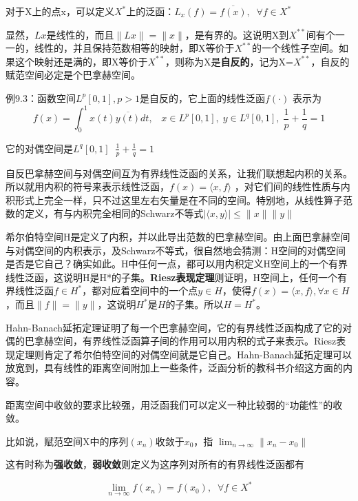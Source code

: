 对于X上的点x，可以定义$ X^* $上的泛函：$ L_x(f) = \overline{f(x)},\;\;  \forall f \in X^* $ 

显然，$ Lx $是线性的，而且$ \|Lx\| = \|x\| $，是有界的。这说明X到$ X^{**} $间有个一一的，线性的，并且保持范数相等的映射，即X等价于$ X^{**} $的一个线性子空间。如果这个映射还是满的，即X等价于$ X^{**} $，则称为X是\textbf{自反的}，记为X=$ X^{**} $，自反的赋范空间必定是个巴拿赫空间。


\kaishu\setlength{\leftskip}{1em}

例9.3：函数空间$ L^p[0,1], p>1 $是自反的，它上面的线性泛函$ f(\cdot) $ 表示为
\[f(x)=\int_0^1 x(t)\overline{y(t)}dt, \;\;\; x\in L^p[0,1],\; y \in L^q[0,1], \;\frac{1}{p}+\frac{1}{q}=1\]

它的对偶空间是$ L^q[0,1] \;\; \frac{1}{p}+\frac{1}{q}=1 $

\songti\setlength{\leftskip}{0em}


自反巴拿赫空间与对偶空间互为有界线性泛函的关系，让我们联想起内积的关系。所以就用内积的符号来表示线性泛函，$f(x)=\langle x,f\rangle$
，对它们间的线性性质与内积形式上完全一样，只不过这里左右矢量是在不同的空间。特别地，从线性算子范数的定义，有与内积完全相同的Schwarz不等式$  |\langle x,y\rangle |\leq \|x\|\|y\| $

希尔伯特空间H是定义了内积，并以此导出范数的巴拿赫空间。由上面巴拿赫空间与对偶空间的内积表示，及Schwarz不等式，很自然地会猜测：H空间的对偶空间是否是它自己？确实如此。H中任何一点，都可以用内积定义H空间上的一个有界线性泛函，这说明H是H*的子集。\textbf{Riesz表现定理}则证明，H空间上，任何一个有界线性泛函$ f\in H^* $，都对应着空间中的一个点$ y\in H $，使得$ f(x)= \langle x,f\rangle ,\forall x\in H $，而且$ \|f\| = \|y\| $，这说明$ H^* $是$ H $的子集。所以$ H=H^* $。

Hahn-Banach延拓定理证明了每一个巴拿赫空间，它的有界线性泛函构成了它的对偶的巴拿赫空间，有界线性泛函算子间的作用可以用内积的式子来表示。Riesz表现定理则肯定了希尔伯特空间的对偶空间就是它自己。Hahn-Banach延拓定理可以放宽到，具有线性的距离空间附加上一些条件，泛函分析的教科书介绍这方面的内容。

距离空间中收敛的要求比较强，用泛函我们可以定义一种比较弱的“功能性”的收敛。

比如说，赋范空间X中的序列$ (x_n) $收敛于$ x_0 $，指 $ \lim_{n\rightarrow \infty}\| x_n - x_0 \| $

这有时称为\textbf{强收敛}，\textbf{弱收敛}则定义为这序列对所有的有界线性泛函都有

\[\lim_{n\rightarrow\infty}f(x_n) = f(x_0),\;\; \forall f \in X^*\]

